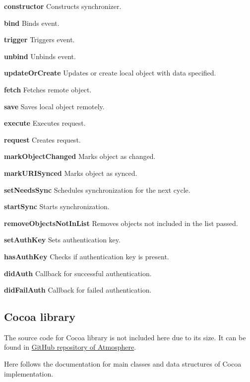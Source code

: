 \item
\textbf{constructor}
Constructs synchronizer.
\item
\textbf{bind}
Binds event.
\item
\textbf{trigger}
Triggers event.
\item
\textbf{unbind}
Unbinds event.
\item
\textbf{updateOrCreate}
Updates or create local object with data specified.
\item
\textbf{fetch}
Fetches remote object.
\item
\textbf{save}
Saves local object remotely.
\item
\textbf{execute}
Executes request.
\item
\textbf{request}
Creates request.
\item
\textbf{markObjectChanged}
Marks object as changed.
\item
\textbf{markURISynced}
Marks object as synced.
\item
\textbf{setNeedsSync}
Schedules synchronization for the next cycle.
\item
\textbf{startSync}
Starts synchronization.
\item
\textbf{removeObjectsNotInList}
Removes objects not included in the list passed.
\item
\textbf{setAuthKey}
Sets authentication key.
\item
\textbf{hasAuthKey}
Checks if authentication key is present.
\item
\textbf{didAuth}
Callback for successful authentication.
\item
\textbf{didFailAuth}
Callback for failed authentication.


\subsection{Cocoa library}

The source code for Cocoa library is not included here due to its size. It can be found in \href{https://github.com/vojto/atmos2-cocoa}{GitHub repository of Atmosphere}.

Here follows the documentation for main classes and data structures of Cocoa implementation.















